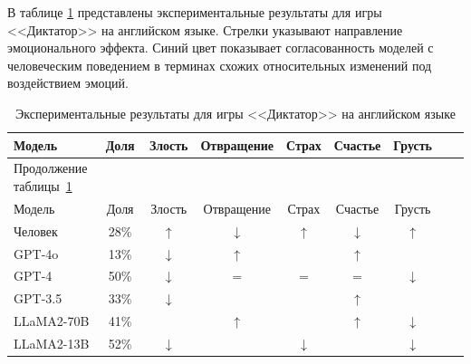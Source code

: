 В таблице \ref{tab:bargaining-en} представлены экспериментальные результаты для игры <<Диктатор>> на английском языке. Стрелки указывают направление эмоционального эффекта. Синий цвет показывает согласованность моделей с человеческим поведением в терминах схожих относительных изменений под воздействием эмоций.

\begin{longtable}[c]{|p{3.8cm}|c|c|c|c|c|c|c|c|}
\caption{Экспериментальные результаты для игры <<Диктатор>> на английском языке}
\label{tab:bargaining-en}
    \\
    \hline
Модель & Доля & Злость & Отвращение & Страх  & Счастье & Грусть \\ \hline
    \endfirsthead   
    \multicolumn{2}{l}{\hspace{-2mm}Продолжение таблицы~\ref{tab:bargaining-en}}        \\ %
\hline

Модель & Доля & Злость & Отвращение & Страх  & Счастье & Грусть \\ \hline \endhead        \hline %
    \endfoot        \hline
    \endlastfoot

Человек & 28\% & $\uparrow$ & $\downarrow$ & $\uparrow$ & $\downarrow$ & $\uparrow$ \\ \hline

GPT-4o & 13\% & $\downarrow$ & $\uparrow$ & \bluearrow{$\uparrow$} & $\uparrow$ & \bluearrow{$\uparrow$} \\

\hline
GPT-4 & 50\% & $\downarrow$ & $=$ & $=$ & $=$ & $\downarrow$ \\ 

\hline
GPT-3.5 & 33\% & $\downarrow$ & \bluearrow{$\downarrow$} & \bluearrow{$\uparrow$} & $\uparrow$ & \bluearrow{$\uparrow$} \\
\hline
LLaMA2-70B & 41\% & \bluearrow{$\uparrow$} & $\uparrow$ & \bluearrow{$\uparrow$} & $\uparrow$ & {$\downarrow $}\\
\hline
LLaMA2-13B & 52\% & $\downarrow$ & \bluearrow{$\downarrow$} & $\downarrow$ & \bluearrow{$\downarrow$} & $\downarrow$ \\
\hline


\end{longtable}
